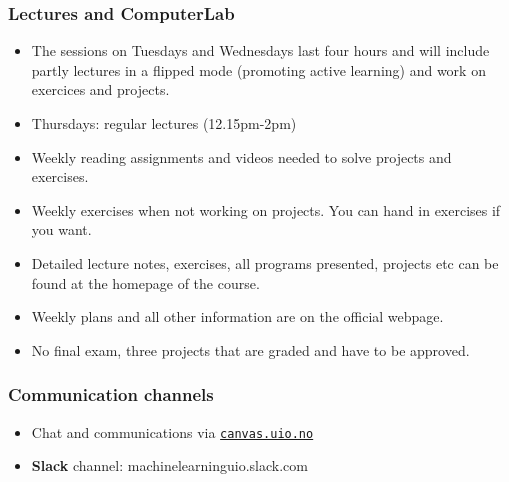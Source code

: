 \documentclass{beamer}
\begin{document}
\begin{frame}
\frametitle{Lectures and ComputerLab}

\begin{block}{}
\begin{itemize}
  \item The sessions on Tuesdays and Wednesdays last four hours and will include partly lectures in a flipped mode (promoting active learning) and work on exercices and projects.

  \item Thursdays: regular lectures (12.15pm-2pm) 

  \item Weekly reading assignments and videos needed to solve projects and exercises.

  \item Weekly exercises when not working on projects. You can hand in exercises if you want.

  \item Detailed lecture notes, exercises, all programs presented, projects etc can be found at the homepage of the course.

  \item Weekly plans and all other information are on the official webpage.

  \item No final exam, three projects that are graded and have to be approved. 
\end{itemize}

\noindent
\end{block}
\end{frame}

\begin{frame}
\frametitle{Communication channels}

\begin{itemize}
\item Chat and communications via \href{{canvas.uio.no}}{\nolinkurl{canvas.uio.no}}

\item \textbf{Slack} channel: machinelearninguio.slack.com
\end{itemize}

\noindent
\end{frame}
\end{document}
